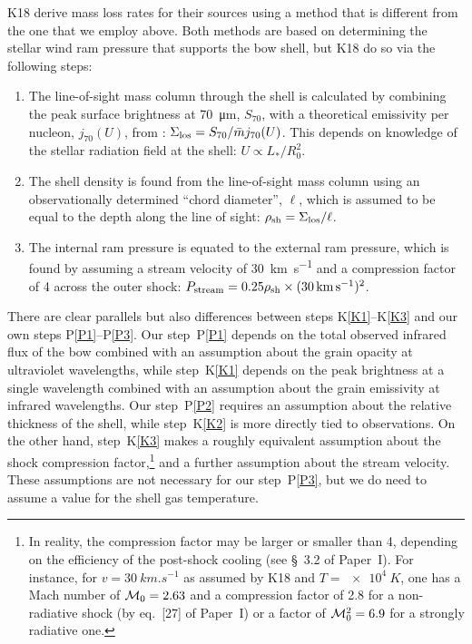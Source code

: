 K18 derive mass loss rates for their sources using a method that is
different from the one that we employ above.  Both methods are based
on determining the stellar wind ram pressure that supports the bow
shell, but K18 do so via the following steps:
\begin{enumerate}[K1.]
\item \label{K1} The line-of-sight mass column through the shell is
  calculated by combining the peak surface brightness at \SI{70}{\um},
  \(S_{70}\), with a theoretical emissivity per nucleon,
  \(j_{70}(U)\), from \citet{Draine:2007a}:
  \(\Sigma_{\text{los}} = S_{70} / \bar{m} j_{70}(U)\).  This depends on
  knowledge of the stellar radiation field at the shell:
  \(U \propto L_* / R_0^2\).
\item \label{K2} The shell density is found from the line-of-sight
  mass column using an observationally determined ``chord diameter'',
  \(\ell\), which is assumed to be equal to the depth along the line
  of sight: \(\rho_{\text{sh}} = \Sigma_{\text{los}} / \ell\).
\item \label{K3} The internal ram pressure is equated to the external
  ram pressure, which is found by assuming a stream velocity of
  \SI{30}{km.s^{-1}} and a compression factor of 4 across the outer
  shock:
  \(P_{\text{stream}} = 0.25 \rho_{\text{sh}} \times
  (\SI{30}{km.s^{-1}})^2\).
\end{enumerate}
There are clear parallels but also differences between steps
K\ref{K1}--K\ref{K3} and our own steps P\ref{P1}--P\ref{P3}.  Our
step~P\ref{P1} depends on the total observed infrared flux of the bow
combined with an assumption about the grain opacity at ultraviolet
wavelengths, while step~K\ref{K1} depends on the peak brightness at a
single wavelength combined with an assumption about the grain
emissivity at infrared wavelengths.  Our step~P\ref{P2} requires an
assumption about the relative thickness of the shell, while
step~K\ref{K2} is more directly tied to observations.
On the other hand, step~K\ref{K3} makes a roughly equivalent
assumption about the shock compression factor,\footnote{%
  In reality, the compression factor may be larger or smaller than 4,
  depending on the efficiency of the post-shock cooling (see
  \S~3.2 of Paper~I).  For instance, for \(v = \SI{30}{km.s^{-1}}\) as
  assumed by K18 and \(T = \SI{e4}{K}\), one has a Mach number of
  \(\mathcal{M}_0 = 2.63\) and a compression factor of 2.8 for a non-radiative
  shock (by
  eq.~[27] of Paper~I) or a factor of
  \(\mathcal{M}_0^2 =6.9\) for a strongly radiative one.} %
and a further assumption about the stream velocity. These assumptions
are not necessary for our step~P\ref{P3}, but we do need to assume a
value for the shell gas temperature.

